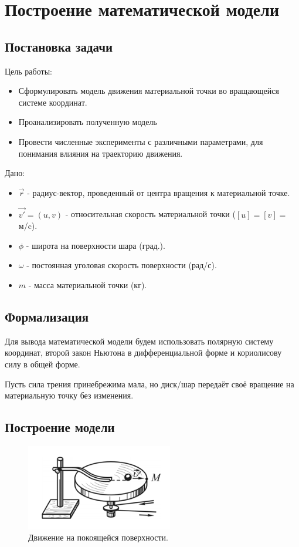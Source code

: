 \chapter{Построение математической модели}
\section{Постановка задачи}
Цель работы:
\begin{itemize}
	\item Сформулировать модель движения материальной точки во вращающейся системе координат.
	\item Проанализировать полученную модель
	\item Провести численные эксперименты с различными параметрами, для понимания влияния на траекторию движения.
\end{itemize}

Дано:
\begin{itemize}
	\item $\overrightarrow{r}$ - радиус-вектор, проведенный от центра вращения к материальной точке.
	\item $\overrightarrow{v'} = (u,v)$ - относительная скорость материальной точки ($[u] = [v]=$м/c).
	\item $\phi$ - широта на поверхности шара (град.).
	\item $\omega$ - постоянная уголовая скорость поверхности (рад/с).
	\item $m$ - масса материальной точки (кг).
\end{itemize}
\section{Формализация}
Для вывода математической модели будем использовать полярную систему координат, второй закон Ньютона\cite{feinman} в дифференциальной форме и кориолисову силу в общей форме.

Пусть сила трения принебрежима мала, но диск/шар передаёт своё вращение на материальную точку без изменения.
\newpage
\section{Построение модели}
\begin{figure}[h]  %
	\centering
	\includegraphics[height=0.2\textwidth]{imgs/base.png}  %
	\caption{Движение на покоящейся поверхности.}  %
	\label{fig:base}  %
\end{figure}

